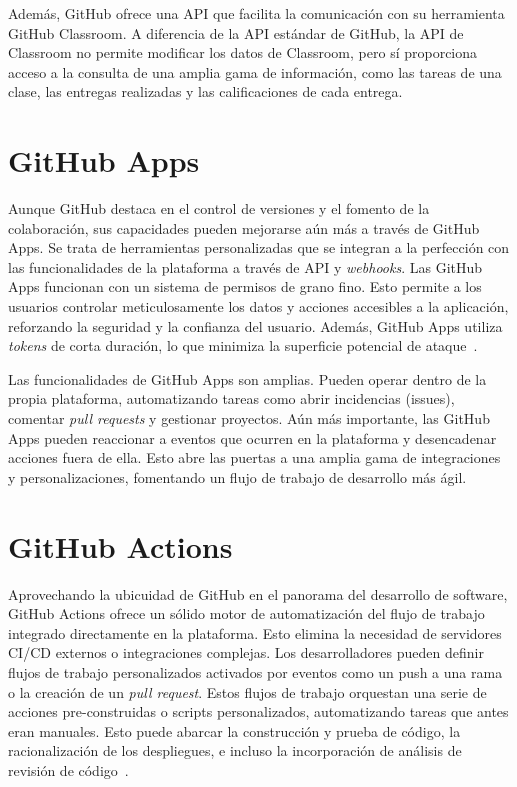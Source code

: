 Además, GitHub ofrece una \acrshort{API} que facilita la comunicación con su herramienta GitHub Classroom. A diferencia de la \acrshort{API} estándar de GitHub, la \acrshort{API} de Classroom no permite modificar los datos de Classroom, pero sí proporciona acceso a la consulta de una amplia gama de información, como las tareas de una clase, las entregas realizadas y las calificaciones de cada entrega.\cite{ClassroomAPI}

\section{GitHub Apps}
Aunque GitHub destaca en el control de versiones y el fomento de la colaboración, sus capacidades pueden mejorarse aún más a través de GitHub Apps. Se trata de herramientas personalizadas que se integran a la perfección con las funcionalidades de la plataforma a través de \acrshort{API} y \textit{webhooks}. Las  GitHub Apps funcionan con un sistema de permisos de grano fino. Esto permite a los usuarios controlar meticulosamente los datos y acciones accesibles a la aplicación, reforzando la seguridad y la confianza del usuario. Además, GitHub Apps utiliza \textit{tokens} de corta duración, lo que minimiza la superficie potencial de ataque~\cite{githubAboutApps}.

Las funcionalidades de GitHub Apps son amplias. Pueden operar dentro de la propia plataforma, automatizando tareas como abrir incidencias (issues), comentar \textit{pull requests} y gestionar proyectos. Aún más importante, las GitHub Apps pueden reaccionar a eventos que ocurren en la plataforma y desencadenar acciones fuera de ella. Esto abre las puertas a una amplia gama de integraciones y personalizaciones, fomentando un flujo de trabajo de desarrollo más ágil.

\section{GitHub Actions}
Aprovechando la ubicuidad de GitHub en el panorama del desarrollo de software, GitHub Actions ofrece un sólido motor de automatización del flujo de trabajo integrado directamente en la plataforma. Esto elimina la necesidad de servidores \acrshort{CI/CD} externos o integraciones complejas. Los desarrolladores pueden definir flujos de trabajo personalizados activados por eventos como un push a una rama o la creación de un \textit{pull request}. Estos flujos de trabajo orquestan una serie de acciones pre-construidas o scripts personalizados, automatizando tareas que antes eran manuales.  Esto puede abarcar la construcción y prueba de código, la racionalización de los despliegues, e incluso la incorporación de análisis de revisión de código~\cite{githubUnderstandingActions}.


